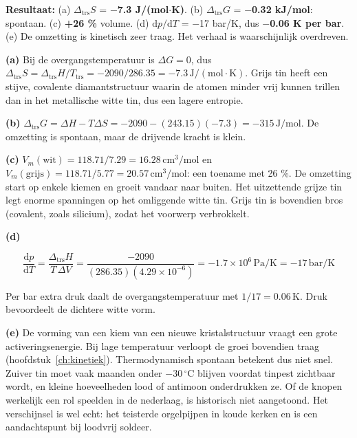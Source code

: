 \begin{oplossing}
\textbf{Resultaat:} (a) \(\Delta_{\text{trs}}S\) = \textbf{\ensuremath{-}7.3 J/(mol\ensuremath{\cdot{}}K)}. (b) \(\Delta_{\text{trs}}G\) = \textbf{\ensuremath{-}0.32 kJ/mol}: spontaan. (c) \textbf{+26 \%} volume. (d) \(\mathrm{d}p/\mathrm{d}T\) = \ensuremath{-}17 bar/K, dus \textbf{\ensuremath{-}0.06 K per bar}. (e) De omzetting is kinetisch zeer traag. Het verhaal is waarschijnlijk overdreven.

\textbf{(a)} Bij de overgangstemperatuur is \(\Delta G = 0\), dus \(\Delta_{\text{trs}}S = \Delta_{\text{trs}}H/T_{\text{trs}} = -2090/286.35 = -7.3\,\mathrm{J/(mol\cdot K)}\). Grijs tin heeft een stijve, covalente diamantstructuur waarin de atomen minder vrij kunnen trillen dan in het metallische witte tin, dus een lagere entropie.

\textbf{(b)} \(\Delta_{\text{trs}}G = \Delta H - T\Delta S = -2090 - (243.15)(-7.3) = -315\,\mathrm{J/mol}\). De omzetting is spontaan, maar de drijvende kracht is klein.

\textbf{(c)} \(V_m(\text{wit}) = 118.71/7.29 = 16.28\,\mathrm{cm^3/mol}\) en \(V_m(\text{grijs}) = 118.71/5.77 = 20.57\,\mathrm{cm^3/mol}\): een toename met 26 \%. De omzetting start op enkele kiemen en groeit vandaar naar buiten. Het uitzettende grijze tin legt enorme spanningen op het omliggende witte tin. Grijs tin is bovendien bros (covalent, zoals silicium), zodat het voorwerp verbrokkelt.

\textbf{(d)}

\[
\frac{\mathrm{d}p}{\mathrm{d}T} = \frac{\Delta_{\text{trs}}H}{T\,\Delta V} = \frac{-2090}{(286.35)(4.29\times10^{-6})} = -1.7\times10^{6}\,\mathrm{Pa/K} = -17\,\mathrm{bar/K}
\]

Per bar extra druk daalt de overgangstemperatuur met \(1/17 = 0.06\,\mathrm{K}\). Druk bevoordeelt de dichtere witte vorm.

\textbf{(e)} De vorming van een kiem van een nieuwe kristalstructuur vraagt een grote activeringsenergie. Bij lage temperatuur verloopt de groei bovendien traag (hoofdstuk~\ref{ch:kinetiek}). Thermodynamisch spontaan betekent dus niet snel. Zuiver tin moet vaak maanden onder \(-30\,^\circ\mathrm{C}\) blijven voordat tinpest zichtbaar wordt, en kleine hoeveelheden lood of antimoon onderdrukken ze. Of de knopen werkelijk een rol speelden in de nederlaag, is historisch niet aangetoond. Het verschijnsel is wel echt: het teisterde orgelpijpen in koude kerken en is een aandachtspunt bij loodvrij soldeer.
\end{oplossing}

